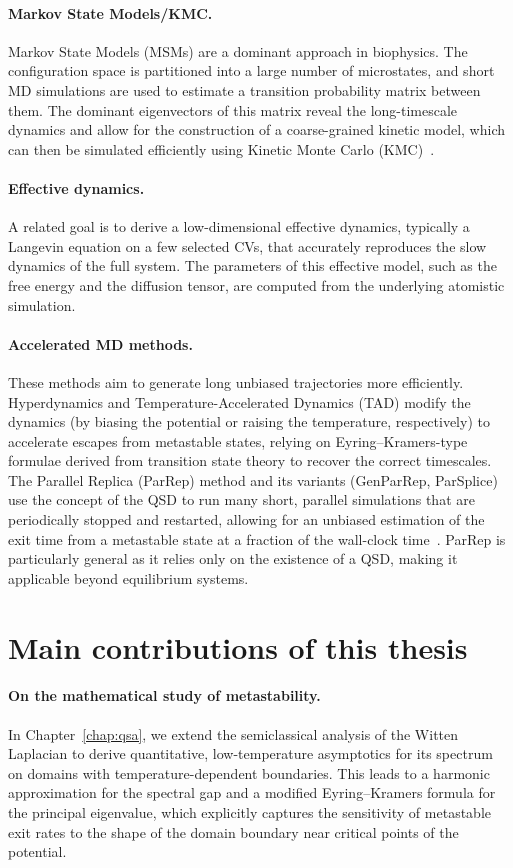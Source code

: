 \paragraph{Markov State Models/KMC.} Markov State Models (MSMs) are a dominant approach in biophysics. The configuration space is partitioned into a large number of microstates, and short MD simulations are used to estimate a transition probability matrix between them. The dominant eigenvectors of this matrix reveal the long-timescale dynamics and allow for the construction of a coarse-grained kinetic model, which can then be simulated efficiently using Kinetic Monte Carlo (KMC)~\cite{BLS25a}.
\paragraph{Effective dynamics.} A related goal is to derive a low-dimensional effective dynamics, typically a Langevin equation on a few selected CVs, that accurately reproduces the slow dynamics of the full system. The parameters of this effective model, such as the free energy and the diffusion tensor, are computed from the underlying atomistic simulation.
\paragraph{Accelerated MD methods.} These methods aim to generate long unbiased trajectories more efficiently. Hyperdynamics and Temperature-Accelerated Dynamics (TAD) modify the dynamics (by biasing the potential or raising the temperature, respectively) to accelerate escapes from metastable states, relying on Eyring--Kramers-type formulae derived from transition state theory to recover the correct timescales. The Parallel Replica (ParRep) method and its variants (GenParRep, ParSplice) use the concept of the QSD to run many short, parallel simulations that are periodically stopped and restarted, allowing for an unbiased estimation of the exit time from a metastable state at a fraction of the wall-clock time~\cite{BLS25a}. ParRep is particularly general as it relies only on the existence of a QSD, making it applicable beyond equilibrium systems.

\section{Main contributions of this thesis}
\label{sec:01:contributions}
\paragraph{On the mathematical study of metastability.} In Chapter~\ref{chap:qsa}, we extend the semiclassical analysis of the Witten Laplacian to derive quantitative, low-temperature asymptotics for its spectrum on domains with temperature-dependent boundaries. This leads to a harmonic approximation for the spectral gap and a modified Eyring--Kramers formula for the principal eigenvalue, which explicitly captures the sensitivity of metastable exit rates to the shape of the domain boundary near critical points of the potential.
